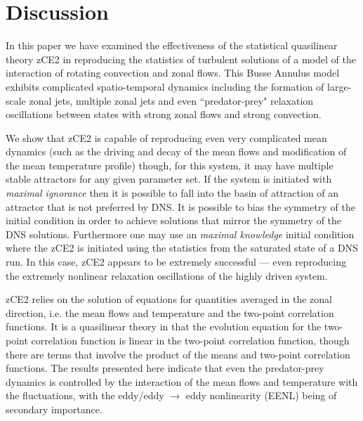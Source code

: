 \documentclass{jfm}
\begin{document}
\section{Discussion}
\label{sec:discussion}

In this paper we have examined the effectiveness of the statistical quasilinear theory zCE2 in reproducing the statistics of turbulent solutions of a model of the interaction of rotating convection and zonal flows. This Busse Annulus model exhibits complicated spatio-temporal dynamics including the formation of large-scale zonal jets, multiple zonal jets and even ``predator-prey" relaxation oscillations between states with strong zonal flows and strong convection.

We show that zCE2 is capable of reproducing even very complicated mean dynamics (such as the driving and decay of the mean flows and modification of the mean temperature profile) though, for this system, it may have multiple stable attractors for any given parameter set. If the system is initiated with \textit{maximal ignorance} then it is possible to fall into the basin of attraction of an attractor that is not preferred by DNS. It is possible to bias the symmetry of the initial condition in order to achieve solutions that mirror the symmetry of the DNS solutions. Furthermore one may use an \textit{maximal knowledge} initial condition where the zCE2 is initiated using the statistics from the saturated state of a DNS run. In this case, zCE2 appears to be extremely successful --- even reproducing the extremely nonlinear relaxation oscillations of the highly driven system.

zCE2 relies on the solution of equations for quantities averaged in the zonal direction, i.e. the mean flows and temperature and the two-point correlation functions.  It is a quasilinear theory in that the evolution equation for the two-point correlation function 
is linear in the two-point correlation function, though there are terms that involve the product of the means and two-point correlation functions. The results presented here indicate that even the predator-prey dynamics is controlled by the interaction of the mean flows and temperature with the fluctuations, with the eddy/eddy $\rightarrow$ eddy nonlinearity (EENL) being of secondary importance. 
\end{document}
